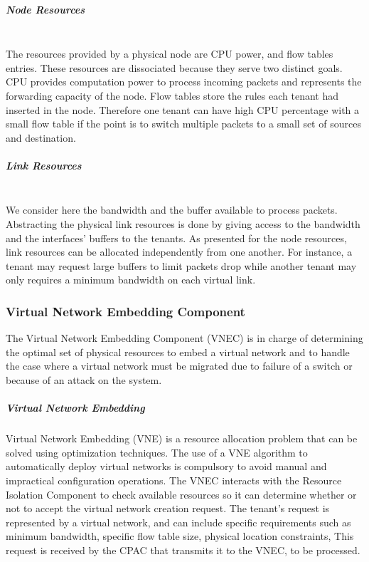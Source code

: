 \subparagraph{\textbf{Node Resources}}\textbf{}\\
The resources provided by a physical node are CPU power, and flow tables entries.
These resources are dissociated because they serve two distinct goals.
CPU provides computation power to process incoming packets and represents the forwarding capacity of the node.
Flow tables store the rules each tenant had inserted in the node.
Therefore one tenant can have high CPU percentage with a small flow table if the point is to switch multiple packets to a small set of sources and destination.

\subparagraph{\textbf{Link Resources}}\textbf{}\\
We consider here the bandwidth and the buffer available to process packets.
Abstracting the physical link resources is done by giving access to the bandwidth and the interfaces' buffers to the tenants.
As presented for the node resources, link resources can be allocated independently from one another.
For instance, a tenant may request large buffers to limit packets drop while another tenant may only requires a minimum bandwidth on each virtual link.

\subsubsection{Virtual Network Embedding Component}

The Virtual Network Embedding Component (VNEC) is in charge of determining the optimal set of physical resources to embed a virtual network and to handle the case where a virtual network must be migrated due to failure of a switch or because of an attack on the system.

\subparagraph{Virtual Network Embedding}
Virtual Network Embedding (VNE) is a resource allocation problem that can be solved using optimization techniques.
The use of a VNE algorithm to automatically deploy virtual networks is compulsory to avoid manual and impractical configuration operations.
The VNEC interacts with the Resource Isolation Component to check available resources so it can determine whether or not to accept the virtual network creation request.
The tenant's request is represented by a virtual network, and can include specific requirements such as minimum bandwidth, specific flow table  size, physical location constraints, \etc 
This request is received by the CPAC that transmits it to the VNEC, to be processed.

